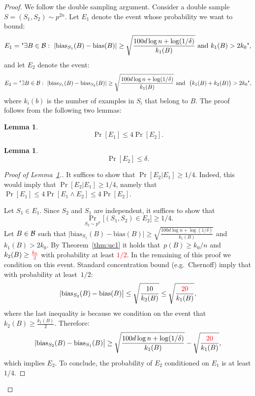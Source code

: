 \documentclass{article}
\newtheorem{lemma}[theorem]{Lemma}
\newcommand{\B}{{\cal B}}
\newcommand{\bias}{\text{bias}}
\newcommand{\samp}{S}
\newcommand{\new}[1]{\textcolor{red}{#1}}
\begin{document}
\begin{proof}
We follow the double sampling argument.
Consider a double sample $S=(\samp_1,\samp_2)\sim p^{2n}$.
Let $E_1$ denote the event whose probability we want to bound:
\[
E_1 = \text{"}\exists {B\in\B}:~\lvert \bias_{\samp_1}(B) -
\bias(B)\rvert \geq \sqrt{\frac{100d\log n + \log(1/\delta)}{k_1(B)}}
\mbox{ and } k_1(B)>2k_0
\text{"}, 
\]
and let $E_2$ denote the event:
\[
E_2 = \text{"}\exists {B\in\B}:~\lvert \bias_{\samp_1}(B) -  \bias_{\samp_2}(B)\rvert \geq \sqrt{\frac{100d\log n + \log(1/\delta)}{k_1(B)}}
  \mbox{ and }~ \bigl(k_1(B) + k_2(B)\bigr)>2k_0
  \text{"},
\]
where $k_i(b)$ is the number of examples in $S_i$ that belong to $B$.
The proof follows from the following two lemmas:
\begin{lemma}\label{lem:aux1}
\[\Pr[E_1]\leq 4\Pr[E_2].\]
\end{lemma}
\begin{lemma}\label{lem:aux2}
\[\Pr[E_2]\leq \delta.\]
\end{lemma}

\begin{proof}[Proof of Lemma~\ref{lem:aux1}.]


It suffices to show that $\Pr[E_2 \vert E_1]\geq 1/4$.
Indeed, this would imply that $\Pr[E_2 \vert E_1]\geq 1/4$, 
namely that $\Pr[E_1] \leq 4\Pr[E_1 \land E_2]\leq 4\Pr[E_2]$.

Let $S_1\in E_1$. Since $S_2$ and $S_1$ are independent,
it suffices to show that 
\[\Pr_{S_2\sim p^n}\bigl[(S_1,S_2)\in E_2\bigr] \geq 1/4.\]
Let $B\in\B$ such that $\lvert \bias_{\samp_1}(B) -  \bias(B)\rvert \geq \sqrt{\frac{100d\log n + \log(1/\delta)}{k_1(B)} }$
and $k_1(B) > 2k_0$. 
By Theorem~\ref{thm:uc1} it holds 
that~$p(B)\geq k_0/n$ and $k_2(B) \geq \new{\frac{k_0}{2}}$
with probability at least \new{$1/2$}.
In the remaining of this proof we condition on this event.
Standard concentration bound (e.g.\ Chernoff)
imply that with probability at least~$1/2$:
\[\lvert \bias_{\samp_2}(B) -  \bias(B)\bigr\rvert \leq \sqrt{\frac{10}{k_2(B)}} \leq \sqrt{\frac{\new{20}}{k_1(B)}},\]
where the last inequality is because we condition on the event that $k_2(B)\geq \frac{k_1(B)}{2}$.
Therefore:
\[\lvert \bias_{\samp_2}(B) -  \bias_{\samp_1}(B)\bigr\rvert \geq \sqrt{\frac{100d\log n + \log(1/\delta)}{k_1(B)} }- \sqrt{\frac{\new{20}}{k_1(B)}},\]
which implies $E_2$.
To conclude, the probability of $E_2$ conditioned on $E_1$
is at least $1/4$.


\end{proof}
\end{proof}
\end{document}
